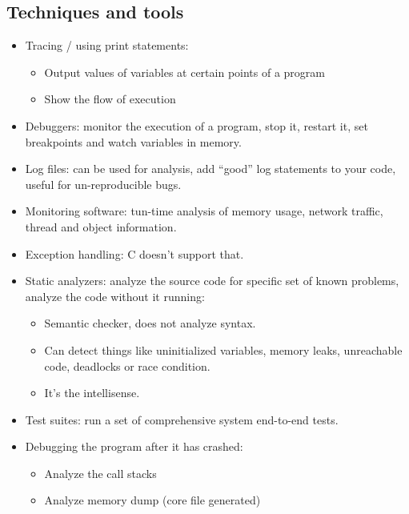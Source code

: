\subsection{Techniques and tools}
\begin{itemize}
    \item Tracing / using print statements:
        \begin{itemize}
            \item Output values of variables at certain points of a program 
            \item Show the flow of execution 
        \end{itemize}
    
    \item Debuggers: monitor the execution of a program, stop it, restart it, set breakpoints and watch variables in memory.
    \item Log files: can be used for analysis, add ``good'' log statements to your code, useful for un-reproducible bugs. 
    \item Monitoring software: tun-time analysis of memory usage, network traffic, thread and object information. 
    \item Exception handling: C doesn't support that. 
    \item Static analyzers: analyze the source code for specific set of known problems, analyze the code without it running: 
        \begin{itemize}
            \item Semantic checker, does not analyze syntax.
            \item Can detect things like uninitialized variables, memory leaks, unreachable code, deadlocks or race condition. 
            \item It's the intellisense. 
        \end{itemize}
    
    \item Test suites: run a set of comprehensive system end-to-end tests.
    \item Debugging the program after it has crashed: 
        \begin{itemize}
            \item Analyze the call stacks 
            \item Analyze memory dump (core file generated)
        \end{itemize}    
\end{itemize}

